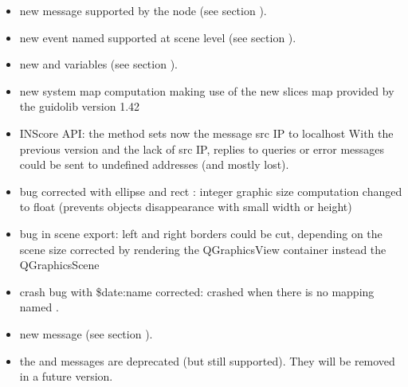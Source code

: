 \begin{itemize}
\item new  message supported by the  node (see section ).
\item new event named  supported at scene level (see section ).
\item new  and  variables (see section ).
\item new system map computation making use of the new slices map provided by the guidolib version 1.42
\item INScore API: the  method sets now the message src IP to localhost
  With the previous version and the lack of src IP, replies to queries or error 
  messages could be sent to undefined addresses (and mostly lost).
\item bug corrected with ellipse and rect : integer graphic size computation changed 
  to float (prevents objects disappearance with small width or height)
\item bug in scene export: left and right borders could be cut, depending  on the scene size
  corrected by rendering the QGraphicsView container instead the QGraphicsScene
\item crash bug with \$date:name corrected: crashed when there is no mapping named .
\end{itemize}

\begin{itemize}
\item new  message  (see section ).
\item the  and  messages are deprecated (but still supported). They will be removed in a future version.
\end{itemize}

